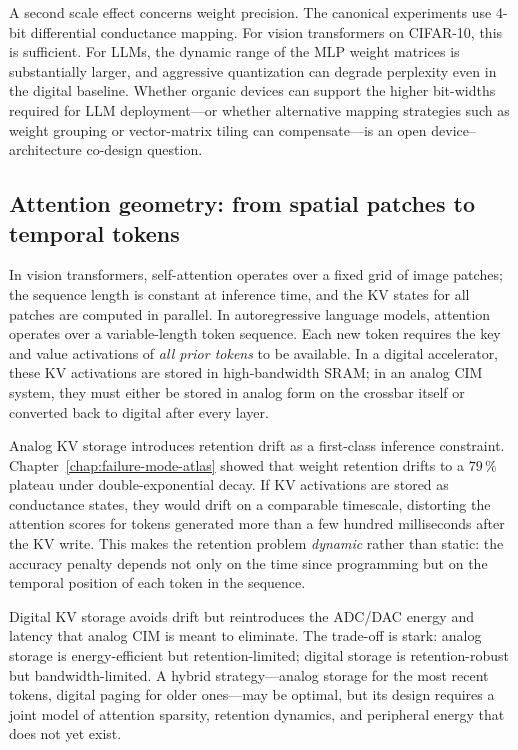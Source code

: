 A second scale effect concerns weight precision.  The canonical experiments use 4-bit differential conductance mapping.  For vision transformers on CIFAR-10, this is sufficient.  For LLMs, the dynamic range of the MLP weight matrices is substantially larger, and aggressive quantization can degrade perplexity even in the digital baseline.  Whether organic devices can support the higher bit-widths required for LLM deployment---or whether alternative mapping strategies such as weight grouping or vector-matrix tiling can compensate---is an open device--architecture co-design question.

\subsection{Attention geometry: from spatial patches to temporal tokens}
\label{subsec:lm-attention}

In vision transformers, self-attention operates over a fixed grid of image patches; the sequence length is constant at inference time, and the KV states for all patches are computed in parallel.  In autoregressive language models, attention operates over a variable-length token sequence.  Each new token requires the key and value activations of \emph{all prior tokens} to be available.  In a digital accelerator, these KV activations are stored in high-bandwidth SRAM; in an analog CIM system, they must either be stored in analog form on the crossbar itself or converted back to digital after every layer.

Analog KV storage introduces retention drift as a first-class inference constraint.  Chapter~\ref{chap:failure-mode-atlas} showed that weight retention drifts to a $79\,\%$ plateau under double-exponential decay.  If KV activations are stored as conductance states, they would drift on a comparable timescale, distorting the attention scores for tokens generated more than a few hundred milliseconds after the KV write.  This makes the retention problem \emph{dynamic} rather than static: the accuracy penalty depends not only on the time since programming but on the temporal position of each token in the sequence.

Digital KV storage avoids drift but reintroduces the ADC/DAC energy and latency that analog CIM is meant to eliminate.  The trade-off is stark: analog storage is energy-efficient but retention-limited; digital storage is retention-robust but bandwidth-limited.  A hybrid strategy---analog storage for the most recent tokens, digital paging for older ones---may be optimal, but its design requires a joint model of attention sparsity, retention dynamics, and peripheral energy that does not yet exist.

